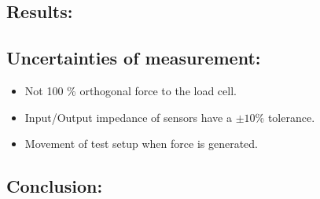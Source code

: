 


\subsection*{Results:}


%

\subsection*{Uncertainties of measurement:}
\begin{itemize}
\item Not 100 \% orthogonal force to the load cell.
\item Input/Output impedance of sensors have a $\pm 10 \%$ tolerance.
\item Movement of test setup when force is generated.
\end{itemize}

\subsection*{Conclusion:}
